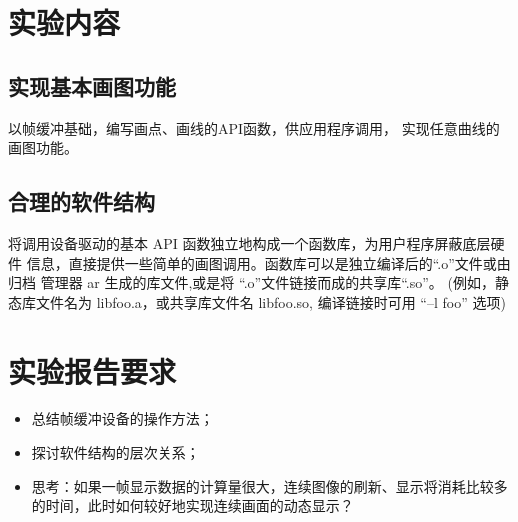 \section{实验内容}
\subsection{实现基本画图功能}
以帧缓冲基础，编写画点、画线的API函数，供应用程序调用，
实现任意曲线的画图功能。

\subsection{合理的软件结构}
将调用设备驱动的基本 API 函数独立地构成一个函数库，为用户程序屏蔽底层硬件
信息，直接提供一些简单的画图调用。函数库可以是独立编译后的``.o''文件或由归档
管理器 ar 生成的库文件,或是将 ``.o''文件链接而成的共享库``.so''。
(例如，静态库文件名为 libfoo.a，或共享库文件名 libfoo.so, 编译链接时可用
``--l foo'' 选项)

\section{实验报告要求}
\begin{itemize}
  \item 总结帧缓冲设备的操作方法；
  \item 探讨软件结构的层次关系；
  \item 思考：如果一帧显示数据的计算量很大，连续图像的刷新、显示将消耗比较多
		的时间，此时如何较好地实现连续画面的动态显示？
\end{itemize}
